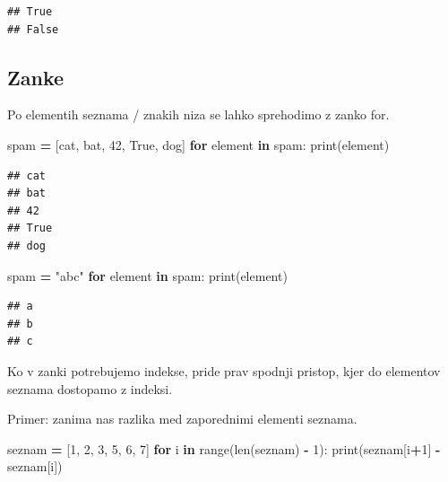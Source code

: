 \documentclass[
]{report}
\newenvironment{Shaded}{\begin{snugshade}}{\end{snugshade}}
\newcommand{\BuiltInTok}[1]{#1}
\newcommand{\ControlFlowTok}[1]{\textcolor[rgb]{0.13,0.29,0.53}{\textbf{#1}}}
\newcommand{\DecValTok}[1]{\textcolor[rgb]{0.00,0.00,0.81}{#1}}
\newcommand{\KeywordTok}[1]{\textcolor[rgb]{0.13,0.29,0.53}{\textbf{#1}}}
\newcommand{\NormalTok}[1]{#1}
\newcommand{\OperatorTok}[1]{\textcolor[rgb]{0.81,0.36,0.00}{\textbf{#1}}}
\newcommand{\StringTok}[1]{\textcolor[rgb]{0.31,0.60,0.02}{#1}}
\newcommand{\VariableTok}[1]{\textcolor[rgb]{0.00,0.00,0.00}{#1}}
\begin{document}
\begin{verbatim}
## True
## False
\end{verbatim}

\hypertarget{zanke-1}{%
\subsection{Zanke}\label{zanke-1}}

Po elementih seznama / znakih niza se lahko sprehodimo z zanko for.

\begin{Shaded}
\begin{Highlighting}[]
\NormalTok{spam }\OperatorTok{=}\NormalTok{ [}\StringTok{\textquotesingle{}cat\textquotesingle{}}\NormalTok{, }\StringTok{\textquotesingle{}bat\textquotesingle{}}\NormalTok{, }\DecValTok{42}\NormalTok{, }\VariableTok{True}\NormalTok{, }\StringTok{\textquotesingle{}dog\textquotesingle{}}\NormalTok{]}
\ControlFlowTok{for}\NormalTok{ element }\KeywordTok{in}\NormalTok{ spam:}
    \BuiltInTok{print}\NormalTok{(element)}
\end{Highlighting}
\end{Shaded}

\begin{verbatim}
## cat
## bat
## 42
## True
## dog
\end{verbatim}

\begin{Shaded}
\begin{Highlighting}[]
\NormalTok{spam }\OperatorTok{=} \StringTok{"abc"}
\ControlFlowTok{for}\NormalTok{ element }\KeywordTok{in}\NormalTok{ spam:}
    \BuiltInTok{print}\NormalTok{(element)}
\end{Highlighting}
\end{Shaded}

\begin{verbatim}
## a
## b
## c
\end{verbatim}

Ko v zanki potrebujemo indekse, pride prav spodnji pristop, kjer do elementov seznama dostopamo z indeksi.

Primer: zanima nas razlika med zaporednimi elementi seznama.

\begin{Shaded}
\begin{Highlighting}[]
\NormalTok{seznam }\OperatorTok{=}\NormalTok{ [}\DecValTok{1}\NormalTok{, }\DecValTok{2}\NormalTok{, }\DecValTok{3}\NormalTok{, }\DecValTok{5}\NormalTok{, }\DecValTok{6}\NormalTok{, }\DecValTok{7}\NormalTok{]}
\ControlFlowTok{for}\NormalTok{ i }\KeywordTok{in} \BuiltInTok{range}\NormalTok{(}\BuiltInTok{len}\NormalTok{(seznam) }\OperatorTok{{-}} \DecValTok{1}\NormalTok{):}
    \BuiltInTok{print}\NormalTok{(seznam[i}\OperatorTok{+}\DecValTok{1}\NormalTok{] }\OperatorTok{{-}}\NormalTok{ seznam[i])}
\end{Highlighting}
\end{Shaded}
\end{document}
